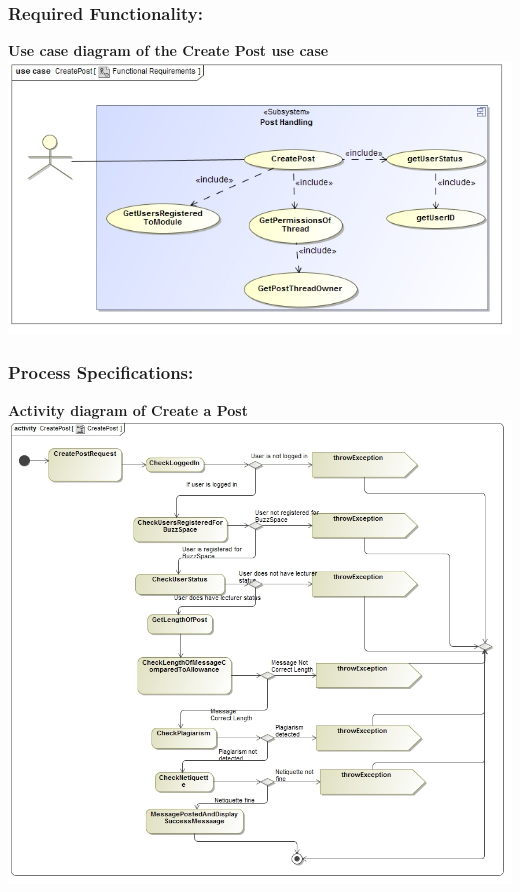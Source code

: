 \documentclass[a4paper,11pt]{article}
\begin{document}
\subsubsection{Required Functionality:} 
\textbf{Use case diagram of the Create Post use case}\\
\includegraphics[width=1\linewidth]{./Images/PostHandling/postCreation.jpg}\\
\subsubsection{Process Specifications:} 
\textbf{Activity diagram of Create a Post}\\ 
\includegraphics[width=1\linewidth]{./Images/PostHandling/postCreationAct.jpg}\\
\end{document}
